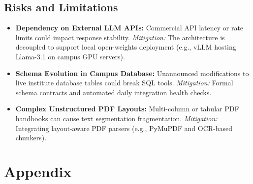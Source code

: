 \documentclass[12pt,a4paper]{report}
\begin{document}
\section{Risks and Limitations}
\begin{itemize}
    \item \textbf{Dependency on External LLM APIs:} Commercial API latency or rate limits could impact response stability. \textit{Mitigation:} The architecture is decoupled to support local open-weights deployment (e.g., vLLM hosting Llama-3.1 on campus GPU servers).
    \item \textbf{Schema Evolution in Campus Database:} Unannounced modifications to live institute database tables could break SQL tools. \textit{Mitigation:} Formal schema contracts and automated daily integration health checks.
    \item \textbf{Complex Unstructured PDF Layouts:} Multi-column or tabular PDF handbooks can cause text segmentation fragmentation. \textit{Mitigation:} Integrating layout-aware PDF parsers (e.g., PyMuPDF and OCR-based chunkers).
\end{itemize}

\appendix
\chapter{Appendix}
\end{document}
